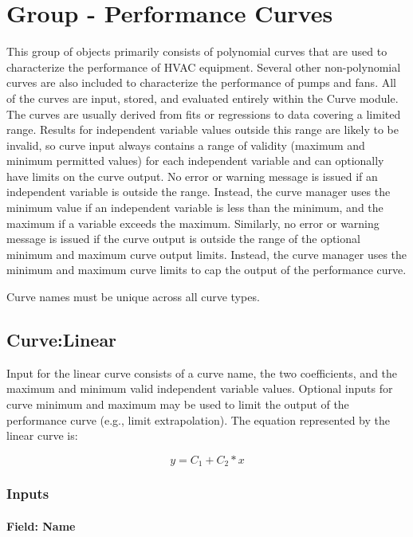 \section{Group - Performance Curves}\label{group-performance-curves}

This group of objects primarily consists of polynomial curves that are used to characterize the performance of HVAC equipment. Several other non-polynomial curves are also included to characterize the performance of pumps and fans. All of the curves are input, stored, and evaluated entirely within the Curve module. The curves are usually derived from fits or regressions to data covering a limited range. Results for independent variable values outside this range are likely to be invalid, so curve input always contains a range of validity (maximum and minimum permitted values) for each independent variable and can optionally have limits on the curve output. No error or warning message is issued if an independent variable is outside the range. Instead, the curve manager uses the minimum value if an independent variable is less than the minimum, and the maximum if a variable exceeds the maximum. Similarly, no error or warning message is issued if the curve output is outside the range of the optional minimum and maximum curve output limits. Instead, the curve manager uses the minimum and maximum curve limits to cap the output of the performance curve.

Curve names must be unique across all curve types.

\subsection{Curve:Linear}\label{curvelinear}

Input for the linear curve consists of a curve name, the two coefficients, and the maximum and minimum valid independent variable values. Optional inputs for curve minimum and maximum may be used to limit the output of the performance curve (e.g., limit extrapolation). The equation represented by the linear curve is:

\begin{equation}
y = {C_1} + {C_2}*x
\end{equation}

\subsubsection{Inputs}\label{inputs-031}

\paragraph{Field: Name}\label{field-name-030}

